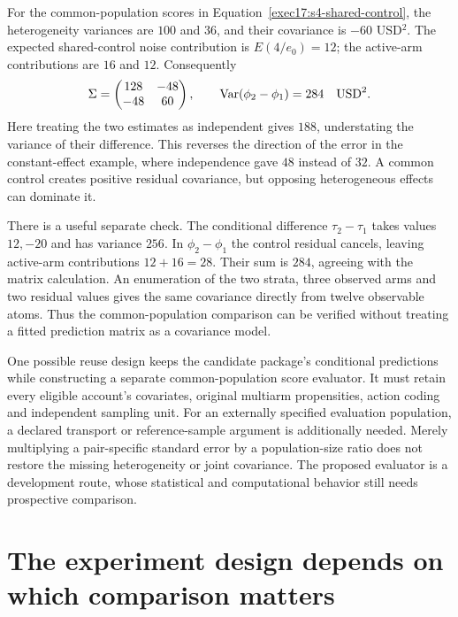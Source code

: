 For the common-population scores in Equation~\eqref{exec17:s4-shared-control},
the heterogeneity variances are $100$ and $36$, and their covariance is
$-60$ USD$^2$. The expected shared-control noise contribution is
$E(4/e_0)=12$; the active-arm contributions are $16$ and $12$.
Consequently
\begin{equation}
 \Sigma=\begin{pmatrix}128&-48\\-48&60\end{pmatrix},\qquad
 \operatorname{Var}(\phi_2-\phi_1)=284\quad {\rm USD}^2.
 \label{exec17:s4-negative-joint}
\end{equation}
Here treating the two estimates as independent gives $188$, understating
the variance of their difference. This reverses the direction of the error
in the constant-effect example, where independence gave $48$ instead of
$32$. A common control creates positive residual covariance, but opposing
heterogeneous effects can dominate it.

There is a useful separate check. The conditional difference
$\tau_2-\tau_1$ takes values $12,-20$ and has variance $256$.
In $\phi_2-\phi_1$ the control residual cancels, leaving active-arm
contributions $12+16=28$. Their sum is $284$, agreeing with the matrix
calculation. An enumeration of the two strata, three observed arms and two
residual values gives the same covariance directly from twelve observable
atoms. Thus the common-population comparison can be verified without
treating a fitted prediction matrix as a covariance model.
\citep{exec17_s4_extension}

One possible reuse design keeps the candidate package's conditional
predictions while constructing a separate common-population score evaluator.
It must retain every eligible account's covariates, original multiarm
propensities, action coding and independent sampling unit. For an externally
specified evaluation population, a declared transport or reference-sample
argument is additionally needed. Merely multiplying a pair-specific standard
error by a population-size ratio does not restore the missing heterogeneity
or joint covariance. The proposed evaluator is a development route, whose
statistical and computational behavior still needs prospective comparison.

\section{The experiment design depends on which comparison matters}
\label{exec17:s4-design-criterion}

